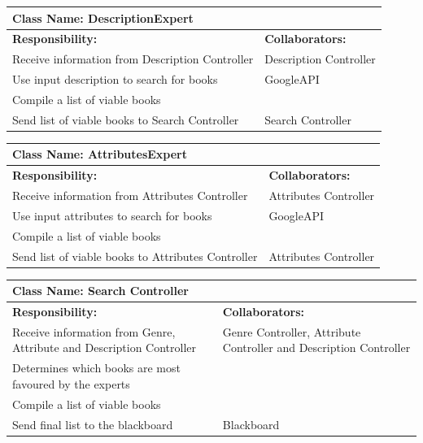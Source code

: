 \documentclass[12pt]{article}
\begin{document}
	\begin{table}[H]
		\centering
		\begin{tabular}{|p{5cm}|p{5cm}|}
		\hline 
		 \multicolumn{2}{|l|}{\textbf{Class Name: DescriptionExpert}} \\
		\hline
		\textbf{Responsibility:} & \textbf{Collaborators:} \\
		\hline
		 Receive information from Description Controller & Description Controller \\
		\hline
		 Use input description to search for books & GoogleAPI \\
		 \hline
		 Compile a list of viable books & \\
		 \hline
		 Send list of viable books to Search Controller & Search Controller \\
		 \hline
		\end{tabular}
	\end{table}
	
	\begin{table}[H]
		\centering
		\begin{tabular}{|p{5cm}|p{5cm}|}
		\hline 
		 \multicolumn{2}{|l|}{\textbf{Class Name: AttributesExpert}} \\
		\hline
		\textbf{Responsibility:} & \textbf{Collaborators:} \\
		\hline
		 Receive information from Attributes Controller & Attributes Controller \\
		\hline
		 Use input attributes to search for books & GoogleAPI \\
		 \hline
		 Compile a list of viable books & \\
		 \hline
		 Send list of viable books to Attributes Controller & Attributes Controller \\
		 \hline
		\end{tabular}
	\end{table}
	
	\begin{table}[H]
		\centering
		\begin{tabular}{|p{5cm}|p{5cm}|}
		\hline 
		 \multicolumn{2}{|l|}{\textbf{Class Name: Search Controller}} \\
		\hline
		\textbf{Responsibility:} & \textbf{Collaborators:} \\
		\hline
		 Receive information from Genre, Attribute and Description Controller  & Genre Controller, Attribute Controller and Description Controller \\
		\hline
		 Determines which books are most favoured  by the experts &  \\
		 \hline
		 Compile a list of viable books & \\
		 \hline
		 Send final list to the blackboard &  Blackboard \\
		 \hline
		\end{tabular}
	\end{table}
	
\end{document}
